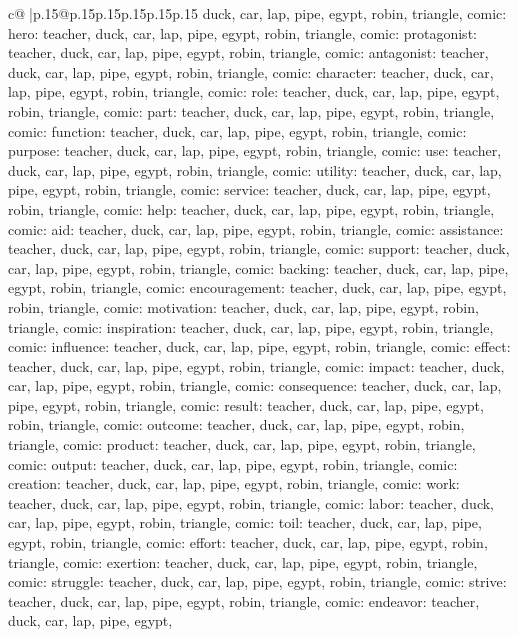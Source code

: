 \documentclass{article}
\begin{document}
{\begin{supertabular}{c@{$\;$}|p{.15\linewidth}@{}p{.15\linewidth}p{.15\linewidth}p{.15\linewidth}p{.15\linewidth}p{.15\linewidth}}
{{{duck, car, lap, pipe, egypt, robin, triangle, comic\n\nCLUE: hero\nTARGETS: teacher, duck, car, lap, pipe, egypt, robin, triangle, comic\n\nCLUE: protagonist\nTARGETS: teacher, duck, car, lap, pipe, egypt, robin, triangle, comic\n\nCLUE: antagonist\nTARGETS: teacher, duck, car, lap, pipe, egypt, robin, triangle, comic\n\nCLUE: character\nTARGETS: teacher, duck, car, lap, pipe, egypt, robin, triangle, comic\n\nCLUE: role\nTARGETS: teacher, duck, car, lap, pipe, egypt, robin, triangle, comic\n\nCLUE: part\nTARGETS: teacher, duck, car, lap, pipe, egypt, robin, triangle, comic\n\nCLUE: function\nTARGETS: teacher, duck, car, lap, pipe, egypt, robin, triangle, comic\n\nCLUE: purpose\nTARGETS: teacher, duck, car, lap, pipe, egypt, robin, triangle, comic\n\nCLUE: use\nTARGETS: teacher, duck, car, lap, pipe, egypt, robin, triangle, comic\n\nCLUE: utility\nTARGETS: teacher, duck, car, lap, pipe, egypt, robin, triangle, comic\n\nCLUE: service\nTARGETS: teacher, duck, car, lap, pipe, egypt, robin, triangle, comic\n\nCLUE: help\nTARGETS: teacher, duck, car, lap, pipe, egypt, robin, triangle, comic\n\nCLUE: aid\nTARGETS: teacher, duck, car, lap, pipe, egypt, robin, triangle, comic\n\nCLUE: assistance\nTARGETS: teacher, duck, car, lap, pipe, egypt, robin, triangle, comic\n\nCLUE: support\nTARGETS: teacher, duck, car, lap, pipe, egypt, robin, triangle, comic\n\nCLUE: backing\nTARGETS: teacher, duck, car, lap, pipe, egypt, robin, triangle, comic\n\nCLUE: encouragement\nTARGETS: teacher, duck, car, lap, pipe, egypt, robin, triangle, comic\n\nCLUE: motivation\nTARGETS: teacher, duck, car, lap, pipe, egypt, robin, triangle, comic\n\nCLUE: inspiration\nTARGETS: teacher, duck, car, lap, pipe, egypt, robin, triangle, comic\n\nCLUE: influence\nTARGETS: teacher, duck, car, lap, pipe, egypt, robin, triangle, comic\n\nCLUE: effect\nTARGETS: teacher, duck, car, lap, pipe, egypt, robin, triangle, comic\n\nCLUE: impact\nTARGETS: teacher, duck, car, lap, pipe, egypt, robin, triangle, comic\n\nCLUE: consequence\nTARGETS: teacher, duck, car, lap, pipe, egypt, robin, triangle, comic\n\nCLUE: result\nTARGETS: teacher, duck, car, lap, pipe, egypt, robin, triangle, comic\n\nCLUE: outcome\nTARGETS: teacher, duck, car, lap, pipe, egypt, robin, triangle, comic\n\nCLUE: product\nTARGETS: teacher, duck, car, lap, pipe, egypt, robin, triangle, comic\n\nCLUE: output\nTARGETS: teacher, duck, car, lap, pipe, egypt, robin, triangle, comic\n\nCLUE: creation\nTARGETS: teacher, duck, car, lap, pipe, egypt, robin, triangle, comic\n\nCLUE: work\nTARGETS: teacher, duck, car, lap, pipe, egypt, robin, triangle, comic\n\nCLUE: labor\nTARGETS: teacher, duck, car, lap, pipe, egypt, robin, triangle, comic\n\nCLUE: toil\nTARGETS: teacher, duck, car, lap, pipe, egypt, robin, triangle, comic\n\nCLUE: effort\nTARGETS: teacher, duck, car, lap, pipe, egypt, robin, triangle, comic\n\nCLUE: exertion\nTARGETS: teacher, duck, car, lap, pipe, egypt, robin, triangle, comic\n\nCLUE: struggle\nTARGETS: teacher, duck, car, lap, pipe, egypt, robin, triangle, comic\n\nCLUE: strive\nTARGETS: teacher, duck, car, lap, pipe, egypt, robin, triangle, comic\n\nCLUE: endeavor\nTARGETS: teacher, duck, car, lap, pipe, egypt, }}}
\end{supertabular}}
\end{document}
